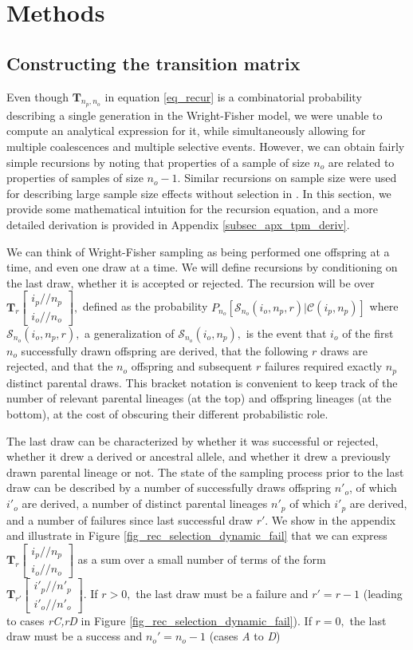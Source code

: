 \documentclass[review]{elsarticle}
\newcommand{\dslash}{/\!\!/}
\newcommand{\Coalc}[4]{\begin{bmatrix}#1\dslash #2 \\ #3\dslash #4 \end{bmatrix}}
\newcommand{\ms}{\mathcal{S}}
\begin{document}
\section{Methods}
\label{sec_methods}

\subsection{Constructing the transition matrix}
\label{subsec_trans_mat}

Even though $\mathbf{T}_{n_p,n_o}$ in equation \ref{eq_recur} is a combinatorial probability
describing a single generation in the Wright-Fisher model, we were unable to compute an analytical
expression for it, while simultaneously allowing for multiple coalescences and multiple selective events. 
However,
we can obtain fairly simple recursions by noting that properties of a sample of size $n_o$ are
related to properties of samples of size $n_o-1.$ Similar recursions on sample size were used for
describing large sample size effects without selection in \citep{BhaskarEtAl2014}. In this section,
we provide some mathematical intuition for the recursion equation, and a more detailed derivation is provided in
Appendix \ref{subsec_apx_tpm_deriv}.

We can think of Wright-Fisher sampling as being performed one offspring at a time,
and even one draw at a time. We will define recursions by conditioning on the last draw, 
whether it is accepted or rejected. 
The recursion will be over $\mathbf{T}_{r}\Coalc{i_p}{n_p}{i_o}{n_o},$ defined as the probability
$P_{n_o}\left[\ms_{n_o}(i_o, n_p, r) | \mathcal{C}(i_p, n_p)\right]$ where $\ms_{n_o}(i_o, n_p, r),$ 
a generalization of  $\ms_{n_o}(i_o, n_p),$ 
is the event that $i_o$ of the first $n_o$ successfully drawn offspring are derived, 
that the following $r$ draws are rejected, and that the $n_o$ offspring and subsequent $r$ failures 
required exactly $n_p$ distinct parental draws. 
This bracket notation is convenient to keep track of
the number of relevant parental lineages (at the top) and offspring lineages (at the bottom), at the
cost of obscuring their different probabilistic role.

The last draw can be characterized by whether it was successful or rejected, whether it drew a 
derived or ancestral allele, and whether it drew a previously drawn parental lineage or not. 
The state of the sampling process prior to the last draw can be described by a number of successfully draws 
offspring $n'_o$, of which $i'_o$ are derived, a number of distinct parental lineages 
$n'_p$ of which $i'_p$ are derived, and a number of failures since last successful draw $r'$.
We show in the appendix and illustrate in Figure \ref{fig_rec_selection_dynamic_fail}  that we 
can express $\mathbf{T}_{r}\Coalc{i_p}{n_p}{i_o}{n_o}$ as a sum over a small number of terms 
of the form $\mathbf{T}_{r'}\Coalc{i'_p}{n'_p}{i'_o}{n'_o}.$ If $r>0,$ the last draw must be a failure 
and $r' = r - 1$ (leading to cases \textit{rC,rD} in Figure \ref{fig_rec_selection_dynamic_fail}).
If $r=0,$ the last draw must be a success and $n_o' = n_o-1$ (cases \textit{A} to \textit{D})
\end{document}
